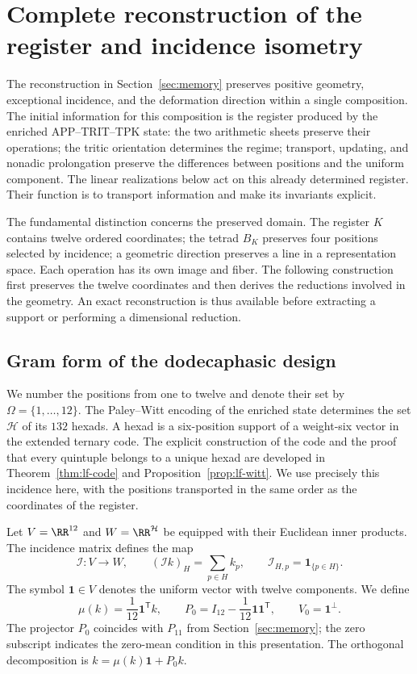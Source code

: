 \section{Complete reconstruction of the register and incidence isometry}
\label{rev4:ki:section}

The reconstruction in Section~\ref{sec:memory} preserves positive
geometry, exceptional incidence, and the deformation direction within
a single composition. The initial information for this composition is
the register produced by the enriched APP--TRIT--TPK state: the two
arithmetic sheets preserve their operations; the tritic orientation
determines the regime; transport, updating, and nonadic prolongation
preserve the differences between positions and the uniform component.
The linear realizations below act on this already determined register.
Their function is to transport information and make its invariants
explicit.

The fundamental distinction concerns the preserved domain. The
register \(K\) contains twelve ordered coordinates; the tetrad
\(B_K\) preserves four positions selected by incidence; a geometric
direction preserves a line in a representation space. Each operation
has its own image and fiber. The following construction first preserves
the twelve coordinates and then derives the reductions involved in the
geometry. An exact reconstruction is thus available before extracting
a support or performing a dimensional reduction.

\subsection{Gram form of the dodecaphasic design}
\label{rev4:ki:gram-subsection}

We number the positions from one to twelve and denote their set by
\(\Omega=\{1,\ldots,12\}\). The Paley--Witt encoding of the
enriched state determines the set \(\mathcal H\) of its \(132\)
hexads. A hexad is a six-position support of a weight-six vector in
the extended ternary code. The explicit construction of the code and
the proof that every quintuple belongs to a unique hexad are developed
in Theorem~\ref{thm:lf-code} and Proposition~\ref{prop:lf-witt}.
We use precisely this incidence here, with the positions transported
in the same order as the coordinates of the register.

Let \(V=\RR^{12}\) and \(W=\RR^{\mathcal H}\) be equipped with
their Euclidean inner products. The incidence matrix defines the map
\begin{equation}
 \mathcal I:V\longrightarrow W,
 \qquad (\mathcal I k)_H=\sum_{p\in H}k_p,
 \qquad \mathcal I_{H,p}=\mathbf1_{\{p\in H\}}.
 \label{rev4:ki:incidence-map}
\end{equation}
The symbol \(\mathbf1\in V\) denotes the uniform vector with twelve
components. We define
\[
 \mu(k)=\frac1{12}\mathbf1^{\mathsf T}k,\qquad
 P_0=I_{12}-\frac1{12}\mathbf1\mathbf1^{\mathsf T},\qquad
 V_0=\mathbf1^\perp.
\]
The projector \(P_0\) coincides with \(P_{11}\) from
Section~\ref{sec:memory}; the zero subscript indicates the zero-mean
condition in this presentation. The orthogonal decomposition is
\(k=\mu(k)\mathbf1+P_0k\).

